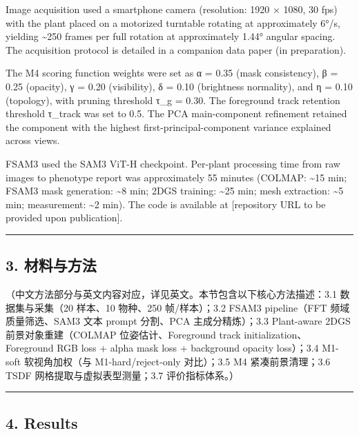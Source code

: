 \documentclass[11pt,a4paper]{article}
\begin{document}
Image acquisition used a smartphone camera (resolution: 1920 × 1080, 30
fps) with the plant placed on a motorized turntable rotating at
approximately 6°/s, yielding \textasciitilde250 frames per full rotation
at approximately 1.44° angular spacing. The acquisition protocol is
detailed in a companion data paper (in preparation).

The M4 scoring function weights were set as α = 0.35 (mask consistency),
β = 0.25 (opacity), γ = 0.20 (visibility), δ = 0.10 (brightness
normality), and η = 0.10 (topology), with pruning threshold τ\_g = 0.30.
The foreground track retention threshold τ\_track was set to 0.5. The
PCA main-component refinement retained the component with the highest
first-principal-component variance explained across views.

FSAM3 used the SAM3 ViT-H checkpoint. Per-plant processing time from raw
images to phenotype report was approximately 55 minutes (COLMAP:
\textasciitilde15 min; FSAM3 mask generation: \textasciitilde8 min; 2DGS
training: \textasciitilde25 min; mesh extraction: \textasciitilde5 min;
measurement: \textasciitilde2 min). The code is available at
{[}repository URL to be provided upon publication{]}.

\begin{center}\rule{0.5\linewidth}{0.5pt}\end{center}

\subsection{3. 材料与方法}\label{ux6750ux6599ux4e0eux65b9ux6cd5}

（中文方法部分与英文内容对应，详见英文。本节包含以下核心方法描述：3.1
数据集与采集（20 样本、10 物种、250 帧/样本）；3.2 FSAM3 pipeline（FFT
频域质量筛选、SAM3 文本 prompt 分割、PCA 主成分精炼）；3.3 Plant-aware
2DGS 前景对象重建（COLMAP 位姿估计、Foreground track
initialization、Foreground RGB loss + alpha mask loss + background
opacity loss）；3.4 M1-soft 软视角加权（与 M1-hard/reject-only
对比）；3.5 M4 紧凑前景清理；3.6 TSDF 网格提取与虚拟表型测量；3.7
评价指标体系。）

\begin{center}\rule{0.5\linewidth}{0.5pt}\end{center}

\subsection{4. Results}\label{results}
\end{document}
